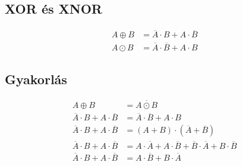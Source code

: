 \documentclass{article}
\begin{document}
\subsection{XOR és XNOR}
\begin{align*}
    A \oplus B &= \overline{A} \cdot B + A \cdot \overline{B} \\
    A \odot B &= \overline{A} \cdot \overline{B} + A \cdot B
\end{align*}

\subsection{Gyakorlás}
\begin{align*}
    A \oplus B &= \overline{A \odot B} \\
    \overline{A} \cdot B + A \cdot \overline{B} &= \overline{A} \cdot \overline{B} + A \cdot B \\
    \overline{A} \cdot B + A \cdot \overline{B} &=
    (A + B) \cdot (\overline{A} + \overline{B}) \\
    \overline{A} \cdot B + A \cdot \overline{B} &=
    A \cdot \overline{A} + A \cdot \overline{B} + \overline{B} \cdot \overline{A} + B \cdot \overline{B} \\
    \overline{A} \cdot B + A \cdot \overline{B} &=
    A \cdot \overline{B} + B \cdot \overline{A} \\
\end{align*}
\end{document}
